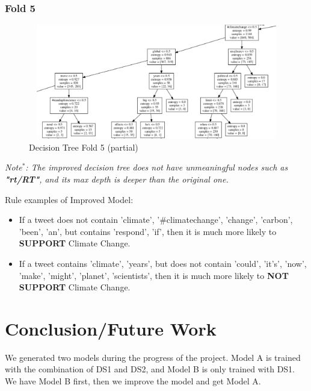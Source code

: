 \documentclass{article} %
\begin{document}
\subsubsection{Fold 5}

\begin{figure}[H]
	\includegraphics[height=5cm, width=17cm]{15.png}
	\caption{Decision Tree Fold 5 (partial)}
\end{figure}

\textit{Note$^*$: The improved decision tree does not have unmeaningful nodes such as \textbf{"rt/RT"}, and its max depth is deeper than the original one.}

Rule examples of Improved Model: 
\begin{itemize}
	\item If a tweet does not contain 'climate', '\#climatechange', 'change', 'carbon', 'been', 'an', but contains 'respond', 'if', then it is much more likely to \textbf{SUPPORT} Climate Change.
	\item If a tweet contains 'climate', 'years', but does not contain 'could', 'it's', 'now', 'make', 'might', 'planet', 'scientists', then it is much more likely to \textbf{NOT SUPPORT} Climate Change.
\end{itemize}





\section{Conclusion/Future Work}


We generated two models during the progress of the project. Model A is trained with the combination of DS1 and DS2, and Model B is only trained with DS1. We have Model B first, then we improve the model and get Model A. 
\end{document}
